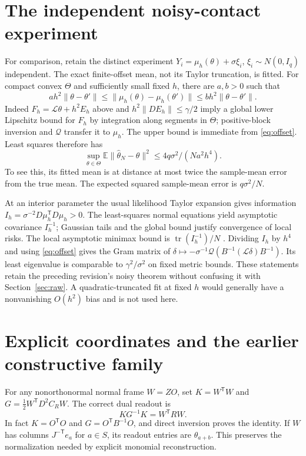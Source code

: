 \documentclass[11pt,reqno]{amsart}
\numberwithin{equation}{section}
\theoremstyle{definition}\newtheorem{definition}[theorem]{Definition}
\theoremstyle{remark}\newtheorem{remark}[theorem]{Remark}
\newcommand{\tr}{\operatorname{tr}}
\newcommand{\LL}{\mathcal L}
\begin{document}
\section{The independent noisy-contact experiment}\label{app:gaussian}
For comparison, retain the distinct experiment $Y_i=\mu_h(\theta)+\sigma\xi_i$, $\xi_i\sim N(0,I_q)$ independent. The exact finite-offset mean, not its Taylor truncation, is fitted. For compact convex $\Theta$ and sufficiently small fixed $h$, there are $a,b>0$ such that
\[
 ah^2\|\theta-\theta'\|\le\|\mu_h(\theta)-\mu_h(\theta')\|
                         \le bh^2\|\theta-\theta'\|.
\]
Indeed $F_h=\LL\theta+h^2E_h$ above and $h^2\|DE_h\|\le\gamma/2$ imply a global lower Lipschitz bound for $F_h$ by integration along segments in $\Theta$; positive-block inversion and $\mathcal Q$ transfer it to $\mu_h$. The upper bound is immediate from \eqref{eq:offset}. Least squares therefore has
\[
 \sup_{\theta\in\Theta}\mathbb E\|\widehat\theta_N-\theta\|^2
                 \le4q\sigma^2/(Na^2h^4).
\]
To see this, its fitted mean is at distance at most twice the sample-mean error from the true mean. The expected squared sample-mean error is $q\sigma^2/N$.

At an interior parameter the usual likelihood Taylor expansion gives information
$I_h=\sigma^{-2}D\mu_h^{\mathsf T}D\mu_h>0$. The least-squares normal equations yield asymptotic covariance $I_h^{-1}$; Gaussian tails and the global bound justify convergence of local risks. The local asymptotic minimax bound is $\tr(I_h^{-1})/N$ \cite{vdV}. Dividing $I_h$ by $h^4$ and using \eqref{eq:offset} gives the Gram matrix of
$\delta\mapsto-\sigma^{-1}\mathcal Q(B^{-1}(\LL\delta)B^{-1})$.
Its least eigenvalue is comparable to $\gamma^2/\sigma^2$ on fixed metric bounds. These statements retain the preceding revision's noisy theorem without confusing it with Section~\ref{sec:raw}. A quadratic-truncated fit at fixed $h$ would generally have a nonvanishing $O(h^2)$ bias and is not used here.

\section{Explicit coordinates and the earlier constructive family}
For any nonorthonormal normal frame $W=ZO$, set $K=W^{\mathsf T}W$ and $G=\tfrac12W^{\mathsf T}D^2C_RW$. The correct dual readout is
\[
 KG^{-1}K=W^{\mathsf T}RW.
\]
In fact $K=O^{\mathsf T}O$ and $G=O^{\mathsf T}B^{-1}O$, and direct inversion proves the identity. If $W$ has columns $J^{-\mathsf T}e_a$ for $a\in S$, its readout entries are $\theta_{a+b}$. This preserves the normalization needed by explicit monomial reconstruction.
\end{document}
